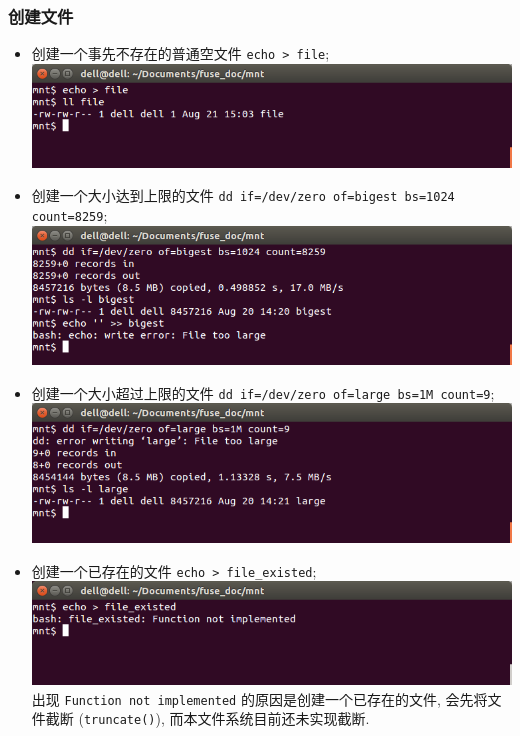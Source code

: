 \documentclass[nofonts, titlepage]{ctexart}
\begin{document}
\subsubsection{创建文件}
\begin{itemize}
\item
  创建一个事先不存在的普通空文件 \texttt{echo > file};\\
  \includegraphics[width=14cm]{./images/./creat_t1.png}
\item
  创建一个大小达到上限的文件
  \texttt{dd if=/dev/zero of=bigest bs=1024 count=8259};\\
  \includegraphics[width=14cm]{./images/./creat_t2.png}
\item
  创建一个大小超过上限的文件
  \texttt{dd if=/dev/zero of=large bs=1M count=9};\\
  \includegraphics[width=14cm]{./images/./creat_t3.png}
\item
  创建一个已存在的文件 \texttt{echo > file\_existed};\\
  \includegraphics[width=14cm]{./images/./creat_t4.png} \\
  出现 \texttt{Function not implemented} 的原因是创建一个已存在的文件,
  会先将文件截断 (\texttt{truncate()}), 而本文件系统目前还未实现截断.
\end{itemize}
\end{document}
